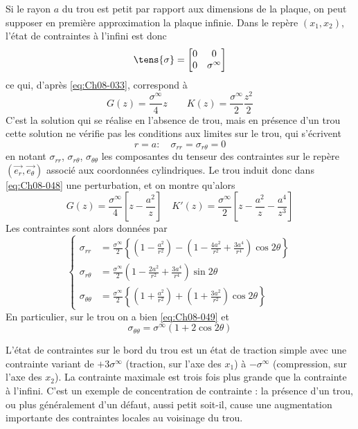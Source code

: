 Si le rayon $a$ du trou est petit par rapport aux dimensions de la plaque, on peut supposer en première approximation la plaque infinie.
Dans le repère $(x_1,x_2)$, l'état de contraintes à l'infini est donc
\begin{equation}
  \tens{\sigma}=
    \begin{bmatrix}
      0 & 0 \\
      0 & \sigma^{\infty}
    \end{bmatrix}
    \label{eq:Ch08-047}
\end{equation}
ce qui, d'après \eqref{eq:Ch08-033}, correspond à 
\begin{equation}
  G(z) = \frac{\sigma^{\infty}}{4} z \qquad K(z) = \frac{\sigma^{\infty}}{2}\frac{z^2}{2}
    \label{eq:Ch08-048}
\end{equation}
C'est la solution qui se réalise en l'absence de trou, mais en présence d'un trou cette solution ne vérifie pas les conditions aux limites sur le trou, qui s'écrivent 
\begin{equation}
  r = a : \quad \sigma_{rr}=\sigma_{r\theta}=0
    \label{eq:Ch08-049}
\end{equation}
en notant $\sigma_{rr}$, $\sigma_{r\theta}$, $\sigma_{\theta\theta}$ les composantes du tenseur des contraintes sur le repère $(\vec{e_r},\vec{e_{\theta}})$ associé aux coordonnées cylindriques. Le trou induit donc dans \eqref{eq:Ch08-048} une perturbation, et on montre qu'alors 
\begin{equation}
  G(z) = \frac{\sigma^{\infty}}{4}\left[z-\frac{a^2}{z}\right] \quad K'(z)=\frac{\sigma^{\infty}}{2}\left[z-\frac{a^2}{z}-\frac{a^4}{z^3}\right]
    \label{eq:Ch08-050}
\end{equation}
Les contraintes sont alors données par 
\begin{equation}
  \left\{
  \begin{aligned}
    \sigma_{rr} & = \frac{\sigma^{\infty}}{2}\left\{(1-\frac{a^2}{r^2})-(1-\frac{4a^2}{r^2}+\frac{3a^4}{r^4})\cos{2\theta}\right\} \\
    \sigma_{r\theta} & = \frac{\sigma^{\infty}}{2} (1-\frac{2a^2}{r^2}+\frac{3a^4}{r^4})\sin{2\theta}  \\
    \sigma_{\theta\theta} & = \frac{\sigma^{\infty}}{2}\left\{(1+\frac{a^2}{r^2})+(1+\frac{3a^2}{r^2})\cos{2\theta}\right\} 
  \end{aligned}
  \right.
    \label{eq:Ch08-051}
\end{equation}
En particulier, sur le trou on a bien \eqref{eq:Ch08-049} et 
\begin{equation}
  \sigma_{\theta\theta}=\sigma^{\infty}(1+2\cos{2\theta})
    \label{eq:Ch08-052}
\end{equation}

L'état de contraintes sur le bord du trou est un état de traction simple avec une contrainte variant de $+3\sigma^{\infty}$ (traction, sur l'axe des $x_1$) à $-\sigma^{\infty}$ (compression, sur l'axe des $x_2$). 
La contrainte maximale est trois fois plus grande que la contrainte à l'infini. 
C'est un exemple de concentration de contrainte : la présence d'un trou, ou plus généralement d'un défaut, aussi petit soit-il, cause une augmentation importante des contraintes locales au voisinage du trou. 

